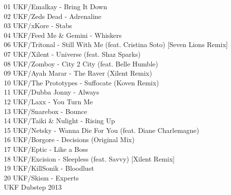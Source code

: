 \begin{multicols}{2}
 01 UKF/Emalkay - Bring It Down\\ 02 UKF/Zeds Dead - Adrenaline\\ 03 UKF/xKore - Stabs\\ 04 UKF/Feed Me \& Gemini - Whiskers\\ 06 UKF/Tritonal - Still With Me (feat. Cristina Soto) [Seven Lions Remix]\\ 07 UKF/Xilent - Universe (feat. Shaz Sparks)\\ 08 UKF/Zomboy - City 2 City (feat. Belle Humble)\\ 09 UKF/Ayah Marar - The Raver (Xilent Remix)\\ 10 UKF/The Prototypes - Suffocate (Koven Remix)\\ 11 UKF/Dubba Jonny - Always\\ 12 UKF/Laxx - You Turn Me\\ 13 UKF/Snarebox - Bounce\\ 14 UKF/Taiki \& Nulight - Rising Up\\ 15 UKF/Netsky - Wanna Die For You (feat. Diane Charlemagne)\\ 16 UKF/Borgore - Decisions (Original Mix)\\ 17 UKF/Eptic - Like a Boss\\ 18 UKF/Excision - Sleepless (feat. Savvy) [Xilent Remix]\\ 19 UKF/KillSonik - Bloodlust\\ 20 UKF/Skism - Experts\\
 \large UKF Dubstep 2013 \normalsize\\

\end{multicols}

